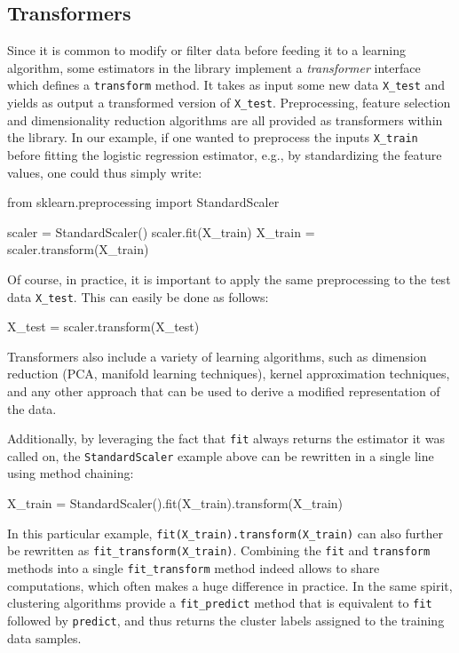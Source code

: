 \documentclass{llncs}
\begin{document}
\subsection{Transformers}

Since it is common to modify or filter data before feeding it to a learning
algorithm, some estimators in the library implement a \textit{transformer}
interface which defines a \texttt{transform} method. It takes as input some new
data \texttt{X\_test} and yields as output a transformed version of
\texttt{X\_test}. Preprocessing, feature selection and dimensionality reduction
algorithms are all provided as transformers within the library.  In our example,
if one wanted to preprocess the inputs \texttt{X\_train} before fitting the
logistic regression estimator, e.g., by standardizing the feature values, one
could thus simply write:
\begin{pythoncode}
from sklearn.preprocessing import StandardScaler

scaler = StandardScaler()
scaler.fit(X_train)
X_train = scaler.transform(X_train)
\end{pythoncode}
Of course, in practice, it is important to apply the same preprocessing to the
test data \texttt{X\_test}. This can easily be done as follows:
\begin{pythoncode}
X_test = scaler.transform(X_test)
\end{pythoncode}
Transformers also include a variety of learning algorithms, such as
dimension reduction (PCA, manifold learning techniques), kernel
approximation techniques, and any other approach that can be used to
derive a modified representation of the data.

Additionally, by leveraging the fact that \texttt{fit} always returns the
estimator it was called on, the \texttt{StandardScaler} example above can be
rewritten in a single line using method chaining:
\begin{pythoncode}
X_train = StandardScaler().fit(X_train).transform(X_train)
\end{pythoncode}
In this particular example, \texttt{fit(X\_train).transform(X\_train)} can also further
be rewritten as \texttt{fit\_transform(X\_train)}.  Combining the \texttt{fit}
and \texttt{transform} methods into a single \texttt{fit\_transform} method
indeed allows to share computations, which often makes a huge difference in practice.
In the same spirit, clustering algorithms provide a
\texttt{fit\_predict} method
that is equivalent to \texttt{fit} followed by \texttt{predict},
and thus returns the cluster labels assigned to the training data samples.
\end{document}
